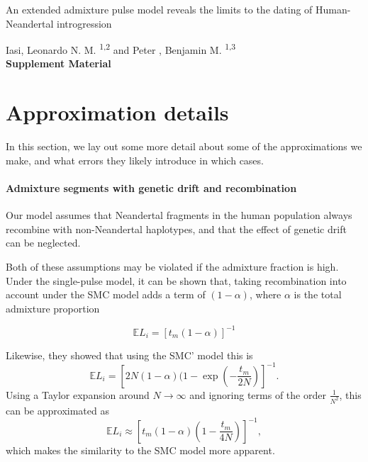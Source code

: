 \documentclass[11pt]{article}
\let\oldparagraph\paragraph
\renewcommand{\paragraph}[1]{\oldparagraph{#1}\mbox{}}
\begin{document}
\begin{titlepage}


    \vspace*{1cm}
        
        
    \begin{center}       
        \large
        \vspace{1cm}
        An extended admixture pulse model reveals the limits to the dating of Human-Neandertal introgression
        
       \vspace{1.0cm}
        \large
        Iasi, Leonardo N. M. \textsuperscript{1,2} and Peter , Benjamin M. \textsuperscript{1,3} \\ 
        
        \vspace{1.0cm}
            \Huge
            \textbf{Supplement Material}
    \end{center} 

            

\end{titlepage}
\section{Approximation details}
In this section, we lay out some more detail about some of the approximations we make, and what errors they likely introduce in which cases.

\paragraph{Admixture segments with genetic drift and recombination}
Our model assumes that Neandertal fragments in the human population always recombine with non-Neandertal haplotypes, and that the effect of genetic drift can be neglected. 

Both of these assumptions may be violated if the admixture fraction is high. Under the single-pulse model, it can be shown that, taking recombination into account under the SMC model \cite{Approximating the coalescent with recombination}  adds a term of $(1-\alpha)$, where $\alpha$ is the total admixture proportion \cite{liang_lengths_2014}

\begin{equation}
    \mathbb{E}L_i = \left[t_m (1-\alpha) \right]^{-1}
\end{equation}

Likewise, they showed that using the SMC' model \cite{marjoram_wall} this is
$$
\mathbb{E}L_i = \left[2N(1-\alpha)(1-\exp\left(-\frac{t_m}{2N}\right)\right]^{-1} \text{.}
$$
Using a Taylor expansion around $N \to \infty$ and ignoring terms of the order $\frac{1}{N^2}$, this can be approximated as 
\begin{equation}
  \mathbb{E}L_i \approx  \left[t_m(1-\alpha)\left(1-\frac{t_m}{4N}\right)\right]^{-1},
\end{equation}
which makes the similarity to the SMC model more apparent.
\end{document}

